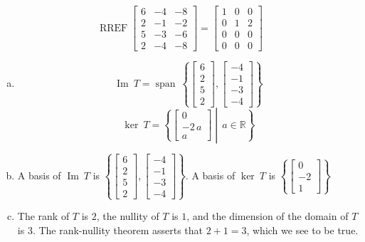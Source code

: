 \begin{exerciseAnswer} 


\[\operatorname{RREF} \left[\begin{array}{ccc}
6 & -4 & -8 \\
2 & -1 & -2 \\
5 & -3 & -6 \\
2 & -4 & -8
\end{array}\right] = \left[\begin{array}{ccc}
1 & 0 & 0 \\
0 & 1 & 2 \\
0 & 0 & 0 \\
0 & 0 & 0
\end{array}\right] \]


\begin{enumerate}[(a)]
\item \[\operatorname{Im}\ T = \operatorname{span}\  \left\{ \left[\begin{array}{c}
6 \\
2 \\
5 \\
2
\end{array}\right] , \left[\begin{array}{c}
-4 \\
-1 \\
-3 \\
-4
\end{array}\right] \right\} \]\[\operatorname{ker}\ T =  \left\{ \left[\begin{array}{c}
0 \\
-2 \, a \\
a
\end{array}\right] \middle|\,a\in\mathbb{R}\right\} \]
\item  A basis of \(\operatorname{Im}\ T\) is \( \left\{ \left[\begin{array}{c}
6 \\
2 \\
5 \\
2
\end{array}\right] , \left[\begin{array}{c}
-4 \\
-1 \\
-3 \\
-4
\end{array}\right] \right\} \). A basis of \(\operatorname{ker}\ T\) is \( \left\{ \left[\begin{array}{c}
0 \\
-2 \\
1
\end{array}\right] \right\} \)
\item  The rank of \(T\) is \( 2 \), the nullity of \(T\) is \( 1 \), and the dimension of the domain of \(T\) is \( 3 \). The rank-nullity theorem asserts that \( 2 + 1 = 3 \), which we see to be true. 
\end{enumerate}
    
\end{exerciseAnswer}
    
